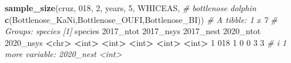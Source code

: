 \documentclass[
]{book}
\newenvironment{Shaded}{\begin{snugshade}}{\end{snugshade}}
\newcommand{\AttributeTok}[1]{\textcolor[rgb]{0.13,0.29,0.53}{#1}}
\newcommand{\CommentTok}[1]{\textcolor[rgb]{0.56,0.35,0.01}{\textit{#1}}}
\newcommand{\DecValTok}[1]{\textcolor[rgb]{0.00,0.00,0.81}{#1}}
\newcommand{\ErrorTok}[1]{\textcolor[rgb]{0.64,0.00,0.00}{\textbf{#1}}}
\newcommand{\FunctionTok}[1]{\textcolor[rgb]{0.13,0.29,0.53}{\textbf{#1}}}
\newcommand{\NormalTok}[1]{#1}
\newcommand{\SpecialCharTok}[1]{\textcolor[rgb]{0.81,0.36,0.00}{\textbf{#1}}}
\newcommand{\StringTok}[1]{\textcolor[rgb]{0.31,0.60,0.02}{#1}}
\begin{document}
\begin{Shaded}
\begin{Highlighting}[]
\FunctionTok{sample\_size}\NormalTok{(cruz, }\StringTok{\textquotesingle{}018\textquotesingle{}}\NormalTok{, }\DecValTok{2}\NormalTok{, years, }\DecValTok{5}\NormalTok{, }\StringTok{\textquotesingle{}WHICEAS\textquotesingle{}}\NormalTok{, }\CommentTok{\# bottlenose dolphin}
            \FunctionTok{c}\NormalTok{(}\StringTok{\textquotesingle{}Bottlenose\_KaNi\textquotesingle{}}\NormalTok{,}\StringTok{\textquotesingle{}Bottlenose\_OUFI\textquotesingle{}}\NormalTok{,}\StringTok{\textquotesingle{}Bottlenose\_BI\textquotesingle{}}\NormalTok{))}
\CommentTok{\# A tibble: 1 x 7}
\CommentTok{\# Groups:   species [1]}
\NormalTok{  species }\StringTok{\textasciigrave{}}\AttributeTok{2017\_ntot}\StringTok{\textasciigrave{}} \StringTok{\textasciigrave{}}\AttributeTok{2017\_nsys}\StringTok{\textasciigrave{}} \StringTok{\textasciigrave{}}\AttributeTok{2017\_nest}\StringTok{\textasciigrave{}} \StringTok{\textasciigrave{}}\AttributeTok{2020\_ntot}\StringTok{\textasciigrave{}} \StringTok{\textasciigrave{}}\AttributeTok{2020\_nsys}\StringTok{\textasciigrave{}}
  \SpecialCharTok{\textless{}}\NormalTok{chr}\SpecialCharTok{\textgreater{}}         \ErrorTok{\textless{}}\NormalTok{int}\SpecialCharTok{\textgreater{}}       \ErrorTok{\textless{}}\NormalTok{int}\SpecialCharTok{\textgreater{}}       \ErrorTok{\textless{}}\NormalTok{int}\SpecialCharTok{\textgreater{}}       \ErrorTok{\textless{}}\NormalTok{int}\SpecialCharTok{\textgreater{}}       \ErrorTok{\textless{}}\NormalTok{int}\SpecialCharTok{\textgreater{}}
\DecValTok{1} \DecValTok{018}               \DecValTok{1}           \DecValTok{0}           \DecValTok{0}           \DecValTok{3}           \DecValTok{3}
\CommentTok{\# i 1 more variable: \textasciigrave{}2020\_nest\textasciigrave{} \textless{}int\textgreater{}}


\end{Highlighting}
\end{Shaded}
\end{document}
